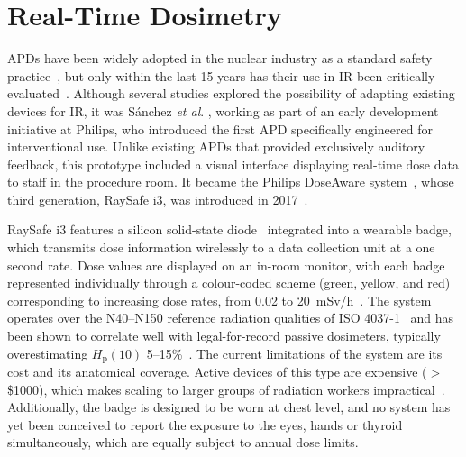 \section{Real-Time Dosimetry}
APDs have been widely adopted in the nuclear industry as a standard safety practice~\cite{69}, but only within the last 15 years has their use in IR been critically evaluated~\cite{2,38,69,70}. Although several studies \cite{20,69,70} explored the possibility of adapting existing devices for IR, it was Sánchez \emph{et al}. \cite{2}, working as part of an early development initiative at Philips, who introduced the first APD specifically engineered for interventional use. Unlike existing APDs that provided exclusively auditory feedback, this prototype included a visual interface displaying real-time dose data to staff in the procedure room. It became the Philips DoseAware system~\cite{71}, whose third generation, RaySafe i3, was introduced in 2017~\cite{76}.

RaySafe i3 features a silicon solid-state diode~\cite{72} integrated into a wearable badge, which transmits dose information wirelessly to a data collection unit at a one second rate. Dose values are displayed on an in-room monitor, with each badge represented individually through a colour-coded scheme (green, yellow, and red) corresponding to increasing dose rates, from 0.02 to 20~mSv/h~\cite{2}. The system operates over the N40--N150 reference radiation qualities of ISO 4037-1~\cite{raysafe_i3} and has been shown to correlate well with legal-for-record passive dosimeters, typically overestimating $H_{\mathrm{p}}(10)$ 5--15\%~\cite{115}. The current limitations of the system are its cost and its anatomical coverage. Active devices of this type are expensive ($>$\,\$1000), which makes scaling to larger groups of radiation workers impractical~\cite{Ger2025}. Additionally, the badge is designed to be worn at chest level, and no system has yet been conceived to report the exposure to the eyes, hands or thyroid simultaneously, which are equally subject to annual dose limits.

